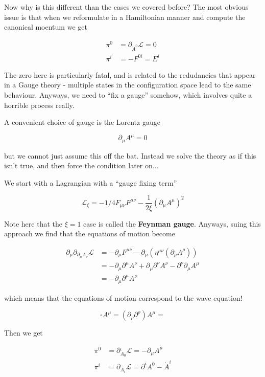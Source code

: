 \documentclass{article}
\theoremstyle{definition}
\begin{document}
Now why is this different than the cases we covered before? The most obvious
issue is that when we reformulate in a Hamiltonian manner and compute the
canonical moentum we get

\begin{align*}
\pi^0 &= \partial_{\dot{A}^0} \mathcal{L} = 0 \\
\pi^i &= -F^{0i} = E^i
\end{align*}

The zero here is particularly fatal, and is related to the redudancies that
appear in a Gauge theory - multiple states in the configuration space lead to
the same behaviour. Anyways, we need to ``fix a gauge'' somehow, which involves
quite a horrible process really. 

A convenient choice of gauge is the Lorentz gauge

$$ \partial_\mu A^\mu = 0 $$

but we cannot just assume this off the bat. Instead we solve the theory as if
this isn't true, and then force the condition later on...

We start with a Lagrangian with a ``gauge fixing term''

$$ \mathcal{L}_\xi = -1/4 F_{\mu \nu} F^{\mu \nu} - \frac{1}{2 \xi}
(\partial_\mu A^\mu)^2 $$

Note here that the $\xi = 1$ case is called the \textbf{Feynman gauge}. Anyways,
suing this approach we find that the equations of motion become

\begin{align*}
\partial_\mu \partial_{\partial_\mu A_\nu} \mathcal{L} &=
-\partial_\mu F^{\mu \nu} - \partial_\mu (\eta^{\mu \nu} (\partial_\rho A^\rho)) \\
&= -\partial_\mu \partial^\mu A^\nu + \partial_\mu \partial^\nu A^\nu - \partial^\nu \partial_\mu A^\mu \\
&= -\partial_\mu \partial^\mu A^\nu
\end{align*}

which means that the equations of motion correspond to the wave equation!

$$ \square A^\mu = (\partial_\rho \partial^\rho) A^\mu = $$

Then we get

\begin{align*}
\pi^0 &= \partial_{\dot{A}_0} \mathcal{L} = -\partial_\mu A^\mu \\
\pi^i &= \partial_{\dot{A}_i} \mathcal{L} = \partial^i A^0 - \dot{A}^i
\end{align*}
\end{document}
